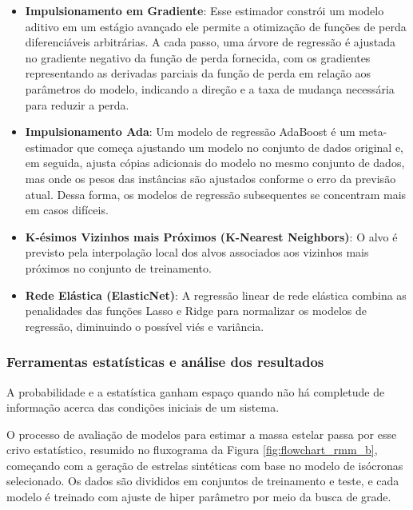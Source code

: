 \begin{itemize}
            \item[(vi)] \textbf{Impulsionamento em Gradiente}: Esse estimador constrói um modelo aditivo em um estágio avançado ele permite a otimização de funções de perda diferenciáveis arbitrárias. A cada passo, uma árvore de regressão é ajustada no gradiente negativo da função de perda fornecida, com os gradientes representando as derivadas parciais da função de perda em relação aos parâmetros do modelo, indicando a direção e a taxa de mudança necessária para reduzir a perda. 
            
            \item[(vii)] \textbf{Impulsionamento Ada}: Um modelo de regressão AdaBoost é um meta-estimador que começa ajustando um modelo no conjunto de dados original e, em seguida, ajusta cópias adicionais do modelo no mesmo conjunto de dados, mas onde os pesos das instâncias são ajustados conforme o erro da previsão atual. Dessa forma, os modelos de regressão subsequentes se concentram mais em casos difíceis.

             \item[(viii)] \textbf{K-ésimos Vizinhos mais Próximos (K-Nearest Neighbors)}: O alvo é previsto pela interpolação local dos alvos associados aos vizinhos mais próximos no conjunto de treinamento.

             \item[(ix)] \textbf{Rede Elástica (ElasticNet)}: A regressão linear de rede elástica combina as penalidades das funções Lasso e Ridge para normalizar os modelos de regressão, diminuindo o possível viés e variância.
        \end{itemize}

        
    \subsubsection{Ferramentas estatísticas e análise dos resultados}\label{sec:estatistica}
        A probabilidade e a estatística ganham espaço quando não há completude de informação acerca das condições iniciais de um sistema.
        
        O processo de avaliação de modelos para estimar a massa estelar passa por esse crivo estatístico, resumido no fluxograma da Figura \ref{fig:flowchart_rmm_b}, começando com a geração de estrelas sintéticas com base no modelo de isócronas selecionado. Os dados são divididos em conjuntos de treinamento e teste, e cada modelo é treinado com ajuste de hiper parâmetro por meio da busca de grade.
        
